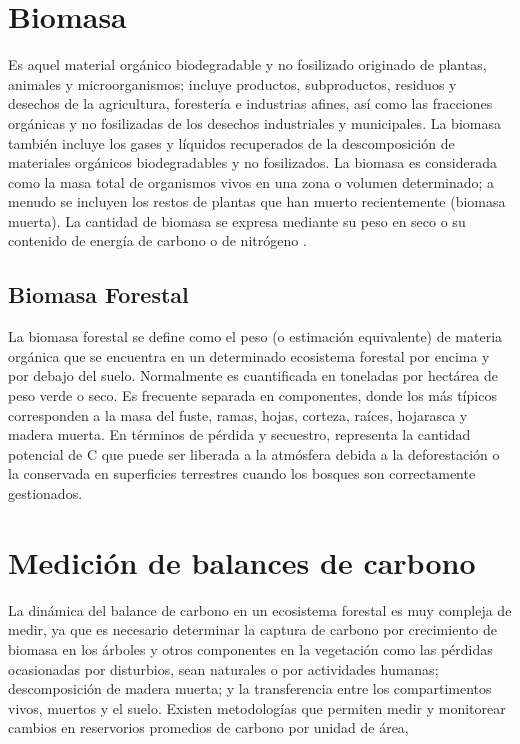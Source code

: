 \section{Biomasa}
Es aquel material org\'anico biodegradable y no fosilizado originado de plantas, animales y microorganismos; incluye productos, subproductos, residuos y desechos de la agricultura, forester\'ia e industrias afines, as\'i como las fracciones org\'anicas y no fosilizadas de los desechos industriales y municipales. La biomasa tambi\'en incluye los gases y l\'iquidos recuperados de la descomposici\'on de materiales org\'anicos biodegradables y no fosilizados\cite{salinas2008guia}.
La biomasa es considerada como la masa total de organismos vivos en una zona o volumen determinado; a menudo se incluyen los restos de plantas que han muerto recientemente (biomasa muerta). La cantidad de biomasa se expresa mediante su peso en seco o su contenido de energ\'ia de carbono o de nitr\'ogeno \cite{garciduenas1987produccion}.
\subsection{Biomasa Forestal}
La biomasa forestal se define como el peso (o estimaci\'on equivalente) de materia org\'anica que
se encuentra en un determinado ecosistema forestal por encima y por debajo del suelo. Normalmente es
cuantificada en toneladas por hect\'area de peso verde o seco. Es frecuente separada en
componentes, donde los m\'as t\'ipicos corresponden a la masa del fuste, ramas, hojas, corteza,
raíces, hojarasca y madera muerta\cite{schlegel2000manual}. 
En t\'erminos de p\'erdida y secuestro, representa la cantidad potencial de C que puede ser liberada a la atm\'osfera debida a la deforestaci\'on o la conservada en superficies terrestres cuando los bosques son correctamente gestionados\cite{lu2005exploring}.

\section{Medici\'on de balances de carbono}
La dinámica del balance de carbono en un ecosistema forestal es muy compleja de medir, ya que es necesario determinar la captura de carbono por crecimiento de biomasa en los \'arboles y otros componentes en la vegetaci\'on como las p\'erdidas ocasionadas por disturbios, sean naturales o por actividades humanas; descomposici\'on de madera muerta; y la transferencia entre los compartimentos vivos, muertos y el suelo\cite{angelsen2008moving}.
Existen metodolog\'ias que permiten medir y monitorear cambios en reservorios promedios de carbono por unidad de \'area, 

